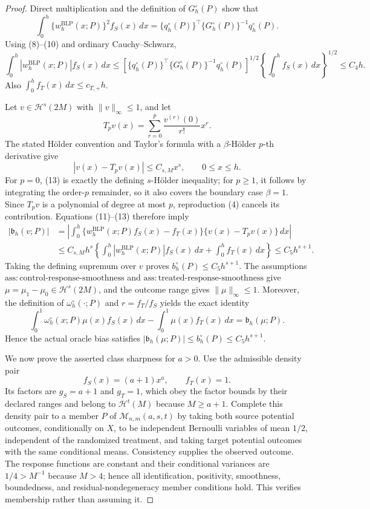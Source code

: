 \documentclass{article}
\begin{document}
\begin{proof}
Direct multiplication and the definition of \(G_h^{\circ}(P)\) show that
\[
\int_0^h\{w_h^{\mathrm{BLP}}(x;P)\}^2f_S(x)\,dx
=\{q_h^{\circ}(P)\}^\top\{G_h^{\circ}(P)\}^{-1}q_h^{\circ}(P).
\tag{10}
\]
Using (8)--(10) and ordinary Cauchy--Schwarz,
\[
\int_0^h|w_h^{\mathrm{BLP}}(x;P)|f_S(x)\,dx
\le
\left[\{q_h^{\circ}(P)\}^\top\{G_h^{\circ}(P)\}^{-1}q_h^{\circ}(P)\right]^{1/2}
\left\{\int_0^hf_S(x)\,dx\right\}^{1/2}
\le C_4h.
\tag{11}
\]
Also \(\int_0^hf_T(x)\,dx\le c_{T,+}h\).

Let \(v\in\mathcal H^s(2M)\) with \(\|v\|_\infty\le1\), and let
\[
T_pv(x)=\sum_{r=0}^p\frac{v^{(r)}(0)}{r!}x^r.
\tag{12}
\]
The stated H\"older convention and Taylor's formula with a \(\beta\)-H\"older \(p\)-th derivative give
\[
|v(x)-T_pv(x)|\le C_{s,M}x^s,
\qquad 0\le x\le h.
\tag{13}
\]
For \(p=0\), (13) is exactly the defining \(s\)-H\"older inequality; for \(p\ge1\), it follows by integrating the order-\(p\) remainder, so it also covers the boundary case \(\beta=1\). Since \(T_pv\) is a polynomial of degree at most \(p\), reproduction (4) cancels its contribution. Equations (11)--(13) therefore imply
\[
\begin{aligned}
|\mathfrak b_h(v;P)|
&=\left|\int_0^h\{w_h^{\mathrm{BLP}}(x;P)f_S(x)-f_T(x)\}\{v(x)-T_pv(x)\}\,dx\right|\\
&\le C_{s,M}h^s
\left\{\int_0^h|w_h^{\mathrm{BLP}}(x;P)|f_S(x)\,dx+\int_0^hf_T(x)\,dx\right\}
\le C_5h^{s+1}.
\end{aligned}
\tag{14}
\]
Taking the defining supremum over \(v\) proves \(b_h^{\circ}(P)\le C_5h^{s+1}\). The assumptions \(\mathrm{ass:control\text{-}response\text{-}smoothness}\) and \(\mathrm{ass:treated\text{-}response\text{-}smoothness}\) give \(\mu=\mu_1-\mu_0\in\mathcal H^s(2M)\), and the outcome range gives \(\|\mu\|_\infty\le1\). Moreover, the definition of \(\omega_h^{\circ}(\cdot;P)\) and \(r=f_T/f_S\) yields the exact identity
\[
\int_0^1\omega_h^{\circ}(x;P)\mu(x)f_S(x)\,dx-
\int_0^1\mu(x)f_T(x)\,dx=\mathfrak b_h(\mu;P).
\tag{15}
\]
Hence the actual oracle bias satisfies \(|\mathfrak b_h(\mu;P)|\le b_h^{\circ}(P)\le C_5h^{s+1}\).

We now prove the asserted class sharpness for \(a>0\). Use the admissible density pair
\[
f_S(x)=(a+1)x^a,
\qquad f_T(x)=1.
\tag{16}
\]
Its factors are \(g_S=a+1\) and \(g_T=1\), which obey the factor bounds by their declared ranges and belong to \(\mathcal H^t(M)\) because \(M\ge a+1\). Complete this density pair to a member \(P\) of \(\mathcal M_{n,m}(a,s,t)\) by taking both source potential outcomes, conditionally on \(X\), to be independent Bernoulli variables of mean \(1/2\), independent of the randomized treatment, and taking target potential outcomes with the same conditional means. Consistency supplies the observed outcome. The response functions are constant and their conditional variances are \(1/4>M^{-1}\) because \(M>4\); hence all identification, positivity, smoothness, boundedness, and residual-nondegeneracy member conditions hold. This verifies membership rather than assuming it.


\end{proof}
\end{document}
